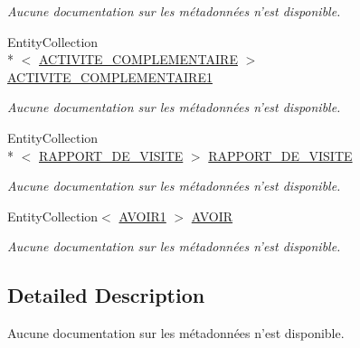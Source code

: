\begin{DoxyCompactItemize}
\begin{DoxyCompactList}\small\item\em Aucune documentation sur les métadonnées n'est disponible. \end{DoxyCompactList}\item 
Entity\-Collection\\*
$<$ \hyperlink{class_model_1_1_a_c_t_i_v_i_t_e___c_o_m_p_l_e_m_e_n_t_a_i_r_e}{A\-C\-T\-I\-V\-I\-T\-E\-\_\-\-C\-O\-M\-P\-L\-E\-M\-E\-N\-T\-A\-I\-R\-E} $>$ \hyperlink{class_model_1_1_c_o_l_l_a_b_o_r_a_t_e_u_r_a7dafc5bd0e0a0e4d1c605ceb365154f8}{A\-C\-T\-I\-V\-I\-T\-E\-\_\-\-C\-O\-M\-P\-L\-E\-M\-E\-N\-T\-A\-I\-R\-E1}
\begin{DoxyCompactList}\small\item\em Aucune documentation sur les métadonnées n'est disponible. \end{DoxyCompactList}\item 
Entity\-Collection\\*
$<$ \hyperlink{class_model_1_1_r_a_p_p_o_r_t___d_e___v_i_s_i_t_e}{R\-A\-P\-P\-O\-R\-T\-\_\-\-D\-E\-\_\-\-V\-I\-S\-I\-T\-E} $>$ \hyperlink{class_model_1_1_c_o_l_l_a_b_o_r_a_t_e_u_r_ad416f8f8000aecc56d0e0ed3be701852}{R\-A\-P\-P\-O\-R\-T\-\_\-\-D\-E\-\_\-\-V\-I\-S\-I\-T\-E}
\begin{DoxyCompactList}\small\item\em Aucune documentation sur les métadonnées n'est disponible. \end{DoxyCompactList}\item 
Entity\-Collection$<$ \hyperlink{class_model_1_1_a_v_o_i_r1}{A\-V\-O\-I\-R1} $>$ \hyperlink{class_model_1_1_c_o_l_l_a_b_o_r_a_t_e_u_r_a948323a5e1d10ad783ec22e2a42b9a67}{A\-V\-O\-I\-R}
\begin{DoxyCompactList}\small\item\em Aucune documentation sur les métadonnées n'est disponible. \end{DoxyCompactList}\end{DoxyCompactItemize}


\subsection{Detailed Description}
Aucune documentation sur les métadonnées n'est disponible. 



